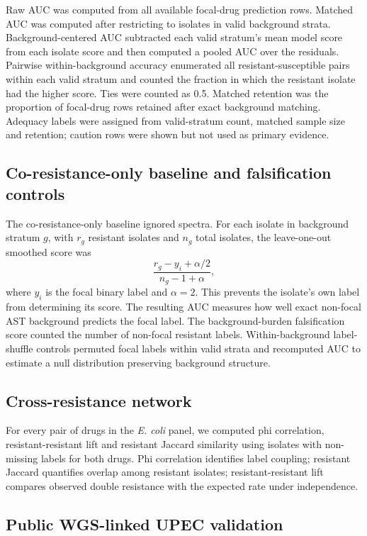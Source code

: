 \documentclass[11pt]{article}
\begin{document}
Raw AUC was computed from all available focal-drug prediction rows. Matched AUC was computed after restricting to isolates in valid background strata. Background-centered AUC subtracted each valid stratum's mean model score from each isolate score and then computed a pooled AUC over the residuals. Pairwise within-background accuracy enumerated all resistant-susceptible pairs within each valid stratum and counted the fraction in which the resistant isolate had the higher score. Ties were counted as 0.5. Matched retention was the proportion of focal-drug rows retained after exact background matching. Adequacy labels were assigned from valid-stratum count, matched sample size and retention; caution rows were shown but not used as primary evidence.

\subsection*{Co-resistance-only baseline and falsification controls}

The co-resistance-only baseline ignored spectra. For each isolate in background stratum $g$, with $r_g$ resistant isolates and $n_g$ total isolates, the leave-one-out smoothed score was
\[
  \frac{r_g-y_i+\alpha/2}{n_g-1+\alpha},
\]
where $y_i$ is the focal binary label and $\alpha=2$. This prevents the isolate's own label from determining its score. The resulting AUC measures how well exact non-focal AST background predicts the focal label. The background-burden falsification score counted the number of non-focal resistant labels. Within-background label-shuffle controls permuted focal labels within valid strata and recomputed AUC to estimate a null distribution preserving background structure.

\subsection*{Cross-resistance network}

For every pair of drugs in the \textit{E. coli} panel, we computed phi correlation, resistant-resistant lift and resistant Jaccard similarity using isolates with non-missing labels for both drugs. Phi correlation identifies label coupling; resistant Jaccard quantifies overlap among resistant isolates; resistant-resistant lift compares observed double resistance with the expected rate under independence.

\subsection*{Public WGS-linked UPEC validation}
\end{document}

